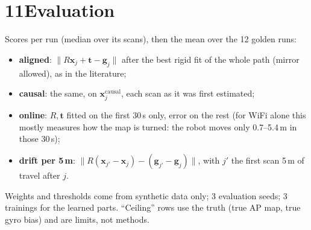 \documentclass[11pt]{article}
\newcommand{\x}{\mathbf{x}}
\newcommand{\g}{\mathbf{g}}
\begin{document}
\section*{11\quad Evaluation}
Scores per run (median over its scans), then the mean over the 12 golden runs:
\begin{itemize}
\item \textbf{aligned}: $\lVert R\x_j+\mathbf{t}-\g_j\rVert$ after the best rigid fit of the whole path (mirror allowed), as in the literature;
\item \textbf{causal}: the same, on $\x^{\text{causal}}_j$, each scan as it was first estimated;
\item \textbf{online}: $R,\mathbf{t}$ fitted on the first 30\,s only, error on the rest (for WiFi alone this mostly
measures how the map is turned: the robot moves only 0.7--5.4\,m in those 30\,s);
\item \textbf{drift per 5\,m}: $\lVert R(\x_{j'}-\x_j)-(\g_{j'}-\g_j)\rVert$, with $j'$ the first scan 5\,m of travel after $j$.
\end{itemize}
Weights and thresholds come from synthetic data only; 3 evaluation seeds; 3 trainings for the learned parts.
``Ceiling'' rows use the truth (true AP map, true gyro bias) and are limits, not methods.
\end{document}
